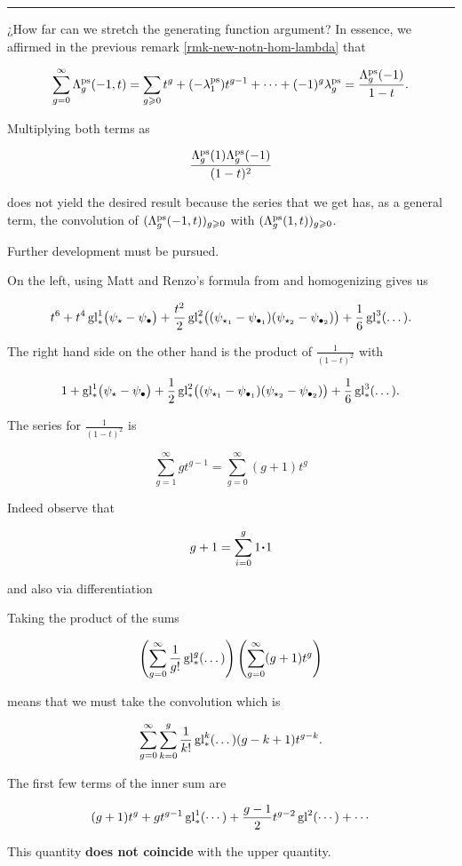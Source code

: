 \documentclass[12pt]{memoir}
\begin{document}
\iffalse
    \hrule

    \begin{Qn}\label{qn-gnr-function-total-lambda}
        ¿How far can we stretch the generating function argument? In essence, we affirmed in the previous remark \ref{rmk-new-notn-hom-lambda} that

        \[\sum_{g=0}^{\infty}\Lambda_g^{\operatorname{\mathrm{ps}}}(-1,t)=\sum_{g\geqslant 0}t^g+(-\lambda_1^{\operatorname{\mathrm{ps}}})t^{g-1}+\dots+(-1)^g\lambda_g^{\operatorname{\mathrm{ps}}}=\frac{\Lambda_g^{\operatorname{\mathrm{ps}}}(-1)}{1-t}.
        \]

        Multiplying both terms as

        \[\frac{\Lambda_g^{\operatorname{\mathrm{ps}}}(1)\Lambda_g^{\operatorname{\mathrm{ps}}}(-1)}{(1-t)^2}\]

        does not yield the desired result because the series that we get has, as a general term, the convolution of \((\Lambda_g^{\operatorname{\mathrm{ps}}}(-1,t))_{g\geqslant 0}\) with \((\Lambda_g^{\operatorname{\mathrm{ps}}}(1,t))_{g\geqslant 0}\).\par
        Further development must be pursued.
    \end{Qn}


    \begin{ptcb}
        On the left, using Matt and Renzo's formula from \cite{MattAndRenzo} and homogenizing gives us

        \[t^6+t^4\operatorname{gl}^1_\ast\bigl(\psi_\star-\psi_\bullet\bigr)+\frac{t^2}{2}\operatorname{gl}^2_\ast\bigl((\psi_{\star_1}-\psi_{\bullet_1})(\psi_{\star_2}-\psi_{\bullet_2})\bigr)+\frac{1}{6}\operatorname{gl}^3_\ast(\dots).\]

        The right hand side on the other hand is the product of \(\frac{1}{(1-t)^2}\) with

        \[1+\operatorname{gl}^1_\ast\bigl(\psi_\star-\psi_\bullet\bigr)+\frac{1}{2}\operatorname{gl}^2_\ast\bigl((\psi_{\star_1}-\psi_{\bullet_1})(\psi_{\star_2}-\psi_{\bullet_2})\bigr)+\frac{1}{6}\operatorname{gl}^3_\ast(\dots).\]

        The series for \(\frac{1}{(1-t)^2}\) is

        \[\sum_{g=1}^{\infty}gt^{g-1}=\sum_{g=0}^\infty(g+1)t^g\]

        \begin{ptcb}
            Indeed observe that

            \[g+1=\sum_{i=0}^{g}1\.1\]

            and also via differentiation
        \end{ptcb}
        Taking the product of the sums

        \[\left(\sum_{g=0}^{\infty}\frac{1}{g!}\operatorname{gl}^g_\ast(\dots)\right)\left(\sum_{g=0}^{\infty}(g+1)t^g\right)\]

        means that we must take the convolution which is

        \[\sum_{g=0}^{\infty}\sum_{k=0}^{g}\frac{1}{k!}\operatorname{gl}_\ast^k(\dots)(g-k+1)t^{g-k}.\]

        The first few terms of the inner sum are

        \[(g+1)t^g+gt^{g-1}\operatorname{gl}^1_\ast(\cdots)+\frac{g-1}{2}t^{g-2}\operatorname{gl}^2(\cdots)+\cdots\]

        This quantity \textbf{does not coincide} with the upper quantity.\par
    \end{ptcb}
\end{document}
